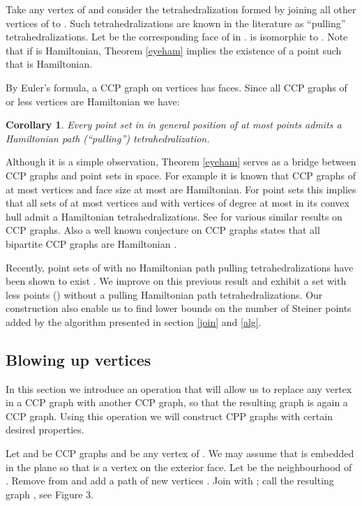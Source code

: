 \documentclass{article}
\newtheorem{cor}[theorem]{Corollary}
\begin{document}
Take any vertex  of  and consider the tetrahedralization
 formed by joining all other vertices of  to .
Such tetrahedralizations are known in the literature as ``pulling'' tetrahedralizations.
Let  be the corresponding face of  in .  is 
isomorphic to . Note that if  is Hamiltonian, 
Theorem \ref{eyeham} implies the existence of a point  such that  is Hamiltonian.\par

By Euler's formula, a CCP graph on  vertices has  faces.
Since all CCP graphs of  or less vertices are Hamiltonian we have:

\begin{cor}\label{corol}
Every point set in  in general position of at most
 points admits a Hamiltonian path (``pulling'') tetrahedralization.
\end{cor}

Although it is a simple observation, Theorem \ref{eyeham} serves as a bridge
between CCP graphs and point sets in space. For example it is known that 
CCP graphs of at most  vertices and face size at most  are Hamiltonian.
For point sets this implies that all sets of at most  vertices and with vertices
of degree at most  in its convex hull admit a Hamiltonian tetrahedralizations.
See \cite{mckay} for various similar results on CCP graphs. Also a well known conjecture on CCP graphs states that all bipartite CCP
graphs are Hamiltonian \cite{barnette}.\par

Recently, point sets of  with no Hamiltonian path pulling tetrahedralizations have 
been shown to exist \cite{isora}. We improve on this previous result
and exhibit a set with less points () without a pulling Hamiltonian
path tetrahedralizations.
Our construction also enable us to find lower bounds on the number of Steiner 
points added by the algorithm presented in section \ref{join} and \ref{alg}.\par

\subsection{Blowing up vertices}

In this section we introduce an operation that will allow us to replace any vertex in a CCP graph
with another CCP graph, so that the resulting graph is again a CCP graph.
Using this operation we will construct CPP graphs with certain desired properties.\par

Let  and  be CCP graphs and  be any vertex of .
We may assume that  is embedded in the plane so that  is a vertex on the exterior face.
Let  be the neighbourhood of . Remove  from 
 and add a path of  new vertices . Join  with ; 
call the resulting graph , see Figure 3.\par
\end{document}
